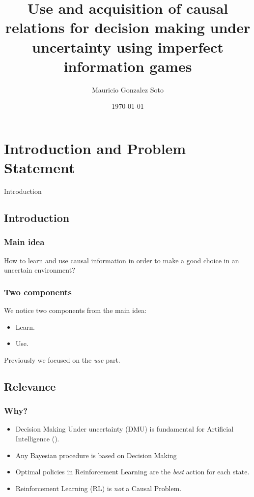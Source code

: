 \documentclass{beamer}
\title{Use and acquisition of causal relations for decision making under uncertainty using imperfect information games} %
\author{Mauricio Gonzalez Soto} %
\institute[INAOE] %
{
Instituto Nacional de Astrofísica Óptica y Electrónica \\ %
\medskip
\textit{mauricio@inaoep.mx} %
}
\date{\today} %
\theoremstyle{plain}
\begin{document}
\begin{frame}
\titlepage %
\end{frame}

\begin{frame}
\tableofcontents
\end{frame}

\section{Introduction and Problem Statement}
\begin{frame}
\begin{center}
\LARGE{Introduction}
\end{center}
\end{frame}
\subsection{Introduction}
\begin{frame}
\frametitle{Main idea}
How to learn and use causal information in order to make a good choice in an uncertain environment?
\end{frame}

\begin{frame}
\frametitle{Two components}
We notice two components from the main idea:
\begin{itemize}
\item Learn.
\item Use.
\end{itemize}
\end{frame}

\begin{frame}
Previously we focused on the \textit{use} part.
\end{frame}

\subsection{Relevance}
\begin{frame}
\frametitle{Why?}
\begin{itemize}
\item Decision Making Under uncertainty (DMU) is fundamental for Artificial Intelligence (\cite{lake2017building}).
\item Any Bayesian procedure is based on Decision Making
\item Optimal policies in Reinforcement Learning are the \textit{best} action for each state.
\item Reinforcement Learning (RL) is \textit{not} a Causal Problem.
\end{itemize}
\end{frame}
\end{document}
